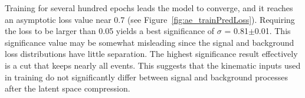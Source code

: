 Training for several hundred epochs leads the model to converge, and it reaches an asymptotic loss value near 0.7 (see Figure~\ref{fig:ae_trainPredLoss}). Requiring the loss to be larger than 0.05 yields a best significance of $\sigma$ = 0.81$\pm$0.01. This significance value may be somewhat misleading since the signal and background loss distributions have little separation. The highest significance result effectively is a cut that keeps nearly all events. This suggests that the kinematic inputs used in training do not significantly differ between signal and background processes after the latent space compression.

